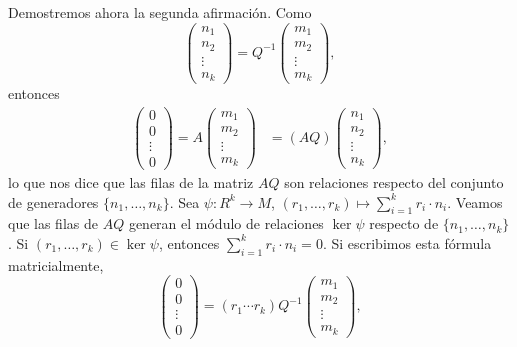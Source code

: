 Demostremos ahora la segunda afirmación. Como
\[
\begin{pmatrix}
n_1\\
n_2\\
\vdots\\
n_k	
\end{pmatrix}
=Q^{-1}\begin{pmatrix}
m_1\\
m_2\\
\vdots\\
m_k
\end{pmatrix},
\]
entonces
\begin{align*}
\begin{pmatrix}
0\\
0\\
\vdots\\
0	
\end{pmatrix}
=A\begin{pmatrix}
m_1\\
m_2\\
\vdots\\
m_k	
\end{pmatrix}
&=
(AQ)\begin{pmatrix}
	n_1\\
	n_2\\
	\vdots\\
	n_k
\end{pmatrix},
\end{align*}
lo que nos dice que las filas de la matriz $AQ$ son relaciones respecto del conjunto de generadores $\{n_1,\dots,n_k\}$. 
Sea $\psi\colon R^k\to M$, $(r_1,\dots,r_k)\mapsto \sum_{i=1}^k r_i\cdot n_i$.  
Veamos que las filas de $AQ$ generan el módulo de relaciones $\ker\psi$ respecto de $\{n_1,\dots,n_k\}$. 
Si $(r_1,\dots,r_k)\in \ker\psi$, entonces
$\sum_{i=1}^k r_i\cdot n_i=0$. Si escribimos esta fórmula matricialmente,  
\[
\begin{pmatrix}
0\\
0\\
\vdots\\
0	
\end{pmatrix}
=(r_1\cdots r_k)Q^{-1}\begin{pmatrix}
m_1\\
m_2\\
\vdots\\
m_k	
\end{pmatrix},
\]
